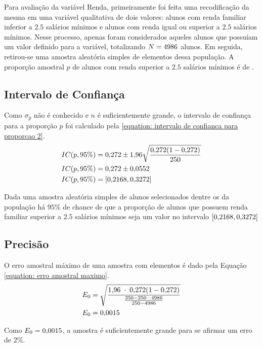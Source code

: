 

Para avaliação da variável Renda, primeiramente foi feita uma recodificação
da mesma em uma variável qualitativa de dois valores: alunos com renda
familiar inferior a $\num{2,5}$ salários mínimos e alunos com renda igual ou
superior a $\num{2,5}$ salários mínimos. Nesse processo, apenas foram considerados
aqueles alunos que possuíam um valor definido para a variável, totalizando
$N=4986$ alunos. Em seguida, retirou-se uma amostra aleatória simples de
\SEISn elementos dessa população. A proporção amostral $\hat{p}$ de alunos
com renda superior a $\num{2.5}$ salários mínimos é de \SEISpAmostral.

\subsection{Intervalo de Confiança}

	Como $\sigma_{\hat{p}}$ não é conhecido e $n$ é suficientemente grande,
	o intervalo de confiança para a proporção $p$ foi calculado pela
	\autoref{equation: intervalo de confianca para proporcao 2}.
	\begin{align*}
		IC(p, 95\%) &= \num{0.272} \pm \num{1.96} \sqrt{\frac{\num{0.272} (1- \num{0.272})}{250}} \\
		IC(p, 95\%) &= \num{0.272} \pm \num{0.0552} \\
		IC(p, 95\%) &= [\num{0.2168}, \num{0.3272}]
	\end{align*}

	Dada uma amostra aleatória simples de \SEISn alunos
	selecionados dentre os \SEISN da população há $95\%$ de chance de que a
	proporção de alunos que possuem renda familiar superior a $\num{2,5}$ salários
	mínimos seja um valor no intervalo $[\num{0.2168}, \num{0.3272}]$

\subsection{Precisão}

	O erro amostral máximo de uma amostra com \SEISn elementos é dado pela
	Equação \ref{equation: erro amostral maximo}.
	\begin{align*}
		E_0 &= \sqrt{\frac{\num{1.96} \;\cdot\; \num{0.272} (1 - \num{0.272}) }{\frac{250 - 250 \;\cdot\; 4986}{250 - 4986}}} \\
		E_0 &= \num{0.0015}
	\end{align*}

	Como $E_0 = \num{0.0015}$, a amostra é suficientemente grande para se afirmar
	um erro de $2\%$.

